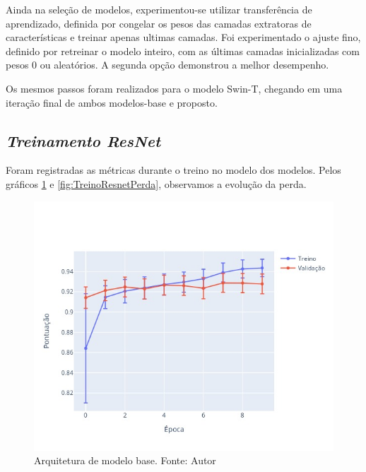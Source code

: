 Ainda na seleção de modelos, experimentou-se utilizar transferência de aprendizado, definida por congelar os pesos das camadas extratoras de características e treinar apenas ultimas camadas. Foi experimentado o ajuste fino, definido por retreinar o modelo inteiro, com as últimas camadas inicializadas com pesos 0 ou aleatórios. A segunda opção demonstrou a melhor desempenho.


Os mesmos passos foram realizados para o modelo Swin-T, chegando em uma iteração final de ambos modelos-base e proposto.

\subsection{\textit{Treinamento ResNet}}\label{sec:Cap3_TrainResnet}
Foram registradas as métricas durante o treino no modelo dos modelos. Pelos gráficos \ref{fig:TreinoResnetScore} e \ref{fig:TreinoResnetPerda}, observamos a evolução da perda.



\begin{figure}[!ht]
    \centering
    \includegraphics[width=\columnwidth]{Imagens/results/rsp-resnet-50_planet_pt/pontuação em treino e validação por época.jpg}
    \caption{ Arquitetura de modelo base. Fonte: Autor}
    \label{fig:TreinoResnetScore}
\end{figure}  

